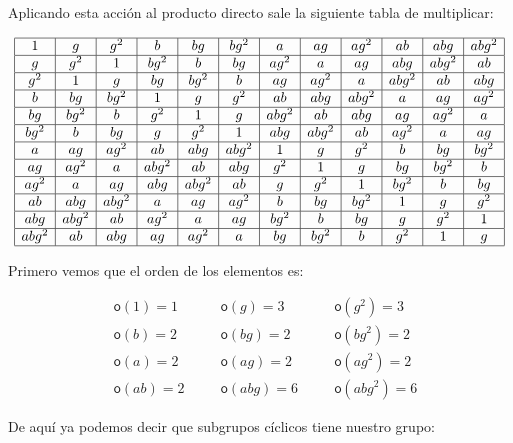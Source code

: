 \documentclass[12pt,a4paper,fleqn,spanish,final,openright]{extbook}
\theoremstyle{definition}
\theoremstyle{remark}
\begin{document}
	Aplicando esta acción al producto directo sale la siguiente tabla de multiplicar:


\begin{align*}
\begin{array}{|c|c|c|c|c|c|c|c|c|c|c|c|}
\hline
1&g&g^2&b&bg&bg^2&a&ag&ag^2&ab&abg&abg^2\\
\hline
g&g^2&1&bg^2&b&bg&ag^2&a&ag&abg&abg^2&ab\\
\hline
g^2&1&g&bg&bg^2&b&ag&ag^2&a&abg^2&ab&abg\\
\hline
b&bg&bg^2&1&g&g^2&ab&abg&abg^2&a&ag&ag^2\\
\hline
bg&bg^2&b&g^2&1&g&abg^2&ab&abg&ag&ag^2&a\\
\hline
bg^2&b&bg&g&g^2&1&abg&abg^2&ab&ag^2&a&ag\\
\hline
a&ag&ag^2&ab&abg&abg^2&1&g&g^2&b&bg&bg^2\\
\hline
ag&ag^2&a&abg^2&ab&abg&g^2&1&g&bg&bg^2&b\\
\hline
ag^2&a&ag&abg&abg^2&ab&g&g^2&1&bg^2&b&bg\\
\hline
ab&abg&abg^2&a&ag&ag^2&b&bg&bg^2&1&g&g^2\\
\hline
abg&abg^2&ab&ag^2&a&ag&bg^2&b&bg&g&g^2&1\\
\hline
abg^2&ab&abg&ag&ag^2&a&bg&bg^2&b&g^2&1&g\\
\hline
\end{array}
\end{align*}

Primero vemos que el orden de los elementos es:

\begin{align*}
&\mathsf{o}{\left({1}\right)} = 1\quad &&\mathsf{o}{\left({g}\right)} = 3\quad &&\mathsf{o}{\left({g^2}\right)} = 3\\
&\mathsf{o}{\left({b}\right)} = 2\quad &&\mathsf{o}{\left({bg}\right)} = 2\quad &&\mathsf{o}{\left({bg^2}\right)} = 2\\
&\mathsf{o}{\left({a}\right)} = 2\quad &&\mathsf{o}{\left({ag}\right)} = 2\quad &&\mathsf{o}{\left({ag^2}\right)} = 2\\
&\mathsf{o}{\left({ab}\right)} = 2\quad &&\mathsf{o}{\left({abg}\right)} = 6\quad &&\mathsf{o}{\left({abg^2}\right)} = 6
\end{align*}

De aquí ya podemos decir que subgrupos cíclicos tiene nuestro grupo:
\end{document}
